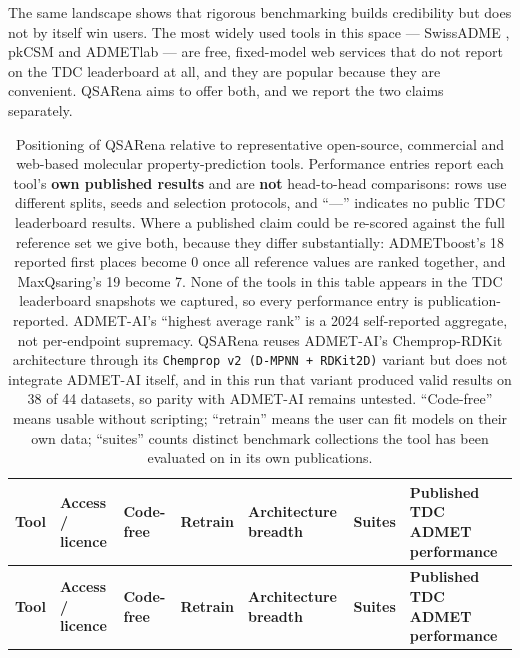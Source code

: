 \documentclass[11pt,a4paper]{article}
\begin{document}
The same landscape shows that rigorous benchmarking builds credibility but does not by itself win users. The most widely used tools in this space --- SwissADME \cite{daina2017swissadme}, pkCSM \cite{pires2015pkcsm} and ADMETlab \cite{fu2024admetlab} --- are free, fixed-model web services that do not report on the TDC leaderboard at all, and they are popular because they are convenient. QSARena aims to offer both, and we report the two claims separately.

\begin{landscape}
\begingroup\scriptsize
\begin{xltabular}{\linewidth}{@{}>{\raggedright\arraybackslash}X>{\raggedright\arraybackslash}Xll>{\raggedright\arraybackslash}Xl>{\raggedright\arraybackslash}X@{}}
\caption{Positioning of QSARena relative to representative open-source, commercial and web-based molecular property-prediction tools. Performance entries report each tool's \textbf{own published results} and are \textbf{not} head-to-head comparisons: rows use different splits, seeds and selection protocols, and ``---'' indicates no public TDC leaderboard results. Where a published claim could be re-scored against the full reference set we give both, because they differ substantially: ADMETboost's 18 reported first places become 0 once all reference values are ranked together, and MaxQsaring's 19 become 7. None of the tools in this table appears in the TDC leaderboard snapshots we captured, so every performance entry is publication-reported. ADMET-AI's ``highest average rank'' is a 2024 self-reported aggregate, not per-endpoint supremacy. QSARena reuses ADMET-AI's Chemprop-RDKit architecture through its \texttt{Chemprop v2 (D-MPNN + RDKit2D)} variant but does not integrate ADMET-AI itself, and in this run that variant produced valid results on 38 of 44 datasets, so parity with ADMET-AI remains untested. ``Code-free'' means usable without scripting; ``retrain'' means the user can fit models on their own data; ``suites'' counts distinct benchmark collections the tool has been evaluated on in its own publications.}\label{tab:landscape}\\
\toprule
\textbf{Tool} & \textbf{Access / licence} & \textbf{Code-free} & \textbf{Retrain} & \textbf{Architecture breadth} & \textbf{Suites} & \textbf{Published TDC ADMET performance} \\
\midrule
\endfirsthead
\toprule
\textbf{Tool} & \textbf{Access / licence} & \textbf{Code-free} & \textbf{Retrain} & \textbf{Architecture breadth} & \textbf{Suites} & \textbf{Published TDC ADMET performance} \\

\end{xltabular}
\end{landscape}
\end{document}

